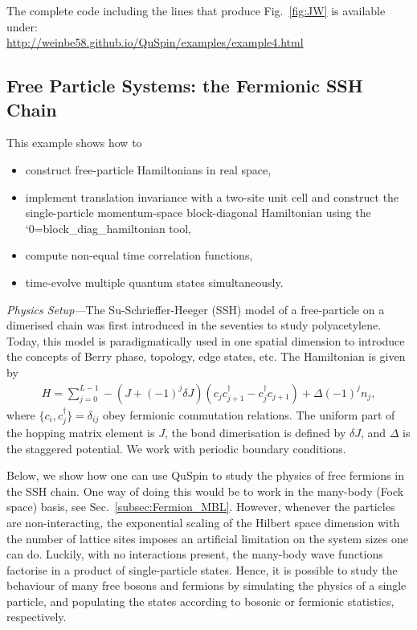 \documentclass{SciPost}
\newcommand\0{\scalebox{-1}[1]{0}}
\let\svttfamily\ttfamily
\renewcommand\ttfamily{\svttfamily\catcode`0=\active }
\renewcommand\texttt{\bgroup\ttfamily\texttthelp}
\def\texttthelp#1{#1\egroup}
\begin{document}
The complete code including the lines that produce Fig.~\ref{fig:JW} is available under:\\

\href{http://weinbe58.github.io/QuSpin/examples/example4.html}{http://weinbe58.github.io/QuSpin/examples/example4.html}\\


\subsection{Free Particle Systems: the Fermionic SSH Chain}

\label{subsec:SSH_model}

This example shows how to
\begin{itemize}
	\item construct free-particle Hamiltonians in real space,
	\item implement translation invariance with a two-site unit cell and construct the single-particle momentum-space block-diagonal Hamiltonian using the \texttt{block\_diag\_hamiltonian} tool,
	\item compute non-equal time correlation functions,
	\item time-evolve multiple quantum states simultaneously.
\end{itemize}

\noindent\emph{Physics Setup---}The Su-Schrieffer-Heeger (SSH) model of a free-particle on a dimerised chain was first introduced in the seventies to study polyacetylene. Today, this model is paradigmatically used in one spatial dimension to introduce the concepts of Berry phase, topology, edge states, etc. The Hamiltonian is given by
\begin{eqnarray}
H = \sum_{j=0}^{L-1} -(J+(-1)^j\delta J)\left(c_jc^\dagger_{j+1} - c^\dagger_{j}c_{j+1}\right) + \Delta(-1)^jn_j, 
\label{eq:SSH}
\end{eqnarray}
where $\{c_i,c^\dagger_j\}=\delta _{ij}$ obey fermionic commutation relations. The uniform part of the hopping matrix element is $J$, the bond dimerisation is defined by $\delta J$, and $\Delta$ is the staggered potential. We work with periodic boundary conditions.

Below, we show how one can use QuSpin to study the physics of free fermions in the SSH chain. One way of doing this would be to work in the many-body (Fock space) basis, see Sec.~\ref{subsec:Fermion_MBL}. However, whenever the particles are non-interacting, the exponential scaling of the Hilbert space dimension with the number of lattice sites imposes an artificial limitation on the system sizes one can do. Luckily, with no interactions present, the many-body wave functions factorise in a product of single-particle states. Hence, it is possible to study the behaviour of many free bosons and fermions by simulating the physics of a single particle, and populating the states according to bosonic or fermionic statistics, respectively.
\end{document}
